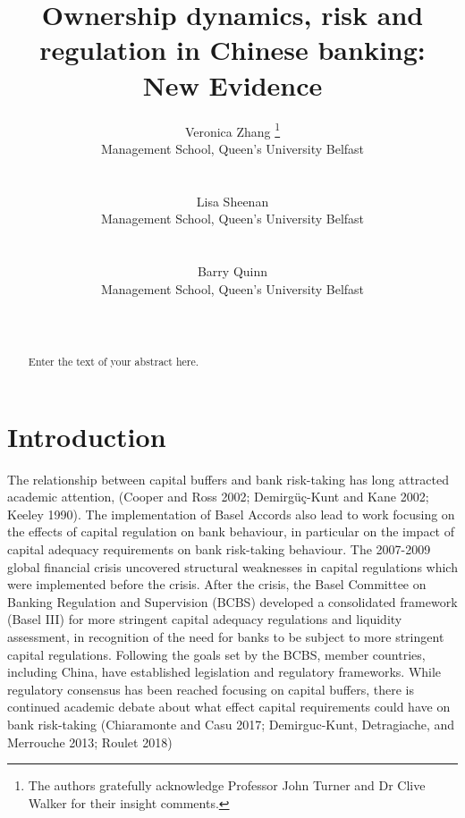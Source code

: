 \documentclass{article}
\title{Ownership dynamics, risk and regulation in Chinese banking: New Evidence}
\author{
    Veronica Zhang
    \thanks{The authors gratefully acknowledge Professor John Turner and Dr Clive
Walker for their insight comments.}
   \\
    Management School, Queen's University Belfast \\
   \\
  \texttt{} \\
   \And
    Lisa Sheenan
   \\
    Management School, Queen's University Belfast \\
   \\
  \texttt{} \\
   \And
    Barry Quinn
   \\
    Management School, Queen's University Belfast \\
   \\
  \texttt{} \\
  }
\begin{document}
\maketitle

\def\tightlist{}


\begin{abstract}
Enter the text of your abstract here.
\end{abstract}


\hypertarget{introduction}{%
\section{Introduction}\label{introduction}}

\label{sec:intro}

The relationship between capital buffers and bank risk-taking has long
attracted academic attention, (Cooper and Ross 2002; Demirgüç-Kunt and
Kane 2002; Keeley 1990). The implementation of Basel Accords also lead
to work focusing on the effects of capital regulation on bank behaviour,
in particular on the impact of capital adequacy requirements on bank
risk-taking behaviour. The 2007-2009 global financial crisis uncovered
structural weaknesses in capital regulations which were implemented
before the crisis. After the crisis, the Basel Committee on Banking
Regulation and Supervision (BCBS) developed a consolidated framework
(Basel III) for more stringent capital adequacy regulations and
liquidity assessment, in recognition of the need for banks to be subject
to more stringent capital regulations. Following the goals set by the
BCBS, member countries, including China, have established legislation
and regulatory frameworks. While regulatory consensus has been reached
focusing on capital buffers, there is continued academic debate about
what effect capital requirements could have on bank risk-taking
(Chiaramonte and Casu 2017; Demirguc-Kunt, Detragiache, and Merrouche
2013; Roulet 2018)
\end{document}
